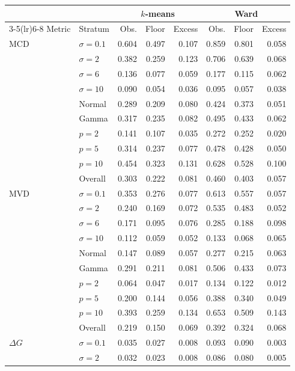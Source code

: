 \begin{tabular}{llrrrrrr}
\toprule
 & & \multicolumn{3}{c}{$k$-means} & \multicolumn{3}{c}{Ward} \\
\cmidrule(lr){3-5}\cmidrule(lr){6-8}
Metric & Stratum & Obs. & Floor & Excess & Obs. & Floor & Excess \\
\midrule
MCD & $\sigma=0.1$ & 0.604 & 0.497 & 0.107 & 0.859 & 0.801 & 0.058 \\
 & $\sigma=2$ & 0.382 & 0.259 & 0.123 & 0.706 & 0.639 & 0.068 \\
 & $\sigma=6$ & 0.136 & 0.077 & 0.059 & 0.177 & 0.115 & 0.062 \\
 & $\sigma=10$ & 0.090 & 0.054 & 0.036 & 0.095 & 0.057 & 0.038 \\
 & Normal & 0.289 & 0.209 & 0.080 & 0.424 & 0.373 & 0.051 \\
 & Gamma & 0.317 & 0.235 & 0.082 & 0.495 & 0.433 & 0.062 \\
 & $p=2$ & 0.141 & 0.107 & 0.035 & 0.272 & 0.252 & 0.020 \\
 & $p=5$ & 0.314 & 0.237 & 0.077 & 0.478 & 0.428 & 0.050 \\
 & $p=10$ & 0.454 & 0.323 & 0.131 & 0.628 & 0.528 & 0.100 \\
 & Overall & 0.303 & 0.222 & 0.081 & 0.460 & 0.403 & 0.057 \\
\addlinespace
MVD & $\sigma=0.1$ & 0.353 & 0.276 & 0.077 & 0.613 & 0.557 & 0.057 \\
 & $\sigma=2$ & 0.240 & 0.169 & 0.072 & 0.535 & 0.483 & 0.052 \\
 & $\sigma=6$ & 0.171 & 0.095 & 0.076 & 0.285 & 0.188 & 0.098 \\
 & $\sigma=10$ & 0.112 & 0.059 & 0.052 & 0.133 & 0.068 & 0.065 \\
 & Normal & 0.147 & 0.089 & 0.057 & 0.277 & 0.215 & 0.063 \\
 & Gamma & 0.291 & 0.211 & 0.081 & 0.506 & 0.433 & 0.073 \\
 & $p=2$ & 0.064 & 0.047 & 0.017 & 0.134 & 0.122 & 0.012 \\
 & $p=5$ & 0.200 & 0.144 & 0.056 & 0.388 & 0.340 & 0.049 \\
 & $p=10$ & 0.393 & 0.259 & 0.134 & 0.653 & 0.509 & 0.143 \\
 & Overall & 0.219 & 0.150 & 0.069 & 0.392 & 0.324 & 0.068 \\
\addlinespace
$\Delta G$ & $\sigma=0.1$ & 0.035 & 0.027 & 0.008 & 0.093 & 0.090 & 0.003 \\
 & $\sigma=2$ & 0.032 & 0.023 & 0.008 & 0.086 & 0.080 & 0.005 \\

\end{tabular}
